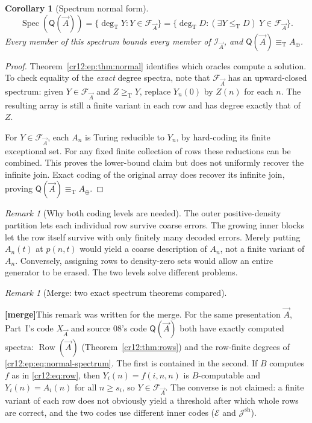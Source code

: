 \documentclass[11pt,letterpaper]{article}
\theoremstyle{plain}
\newtheorem{corollary}[theorem]{Corollary}
\theoremstyle{definition}
\theoremstyle{remark}
\newtheorem{remark}[theorem]{Remark}
\numberwithin{equation}{section}
\newcommand{\leT}{\leq_{\mathrm T}}
\newcommand{\geT}{\geq_{\mathrm T}}
\newcommand{\eqT}{\equiv_{\mathrm T}}
\newcommand{\Spec}{\operatorname{Spec}}
\newcommand{\Row}{\operatorname{Row}}
\newcommand{\degT}{\deg_{\mathrm T}}
\newcommand{\Ecode}{\mathcal E}
\newcommand{\I}{\mathcal I}
\newcommand{\mergenote}[1]{\par\smallskip\noindent
 {\small\textsf{\textbf{[merge]}}\enspace #1}\par\smallskip}
\newcommand{\Aplus}{A_{\oplus}}          %
\newcommand{\Jsh}{\mathcal J^{\mathrm{sh}}} %
\newcommand{\QQ}{\mathsf Q}              %
\newcommand{\FF}{\mathcal F}             %
\begin{document}
\begin{corollary}[Spectrum normal form]\label{cr12:ep:cor:normal-spectrum}
\begin{equation}\label{cr12:ep:eq:normal-spectrum}
 \Spec(\QQ(\vec A))
 =\{\degT Y:Y\in\FF_{\vec A}\}
 =\{\degT D:(\exists Y\leT D)\ Y\in\FF_{\vec A}\}.
\end{equation}
Every member of this spectrum bounds every member of $\I_{\vec A}$, and
$\QQ(\vec A)\eqT \Aplus$.
\end{corollary}
\begin{proof}
Theorem~\ref{cr12:ep:thm:normal} identifies which oracles compute a solution. To
check equality of the \emph{exact} degree spectra, note that $\FF_{\vec A}$ has an
upward-closed spectrum: given $Y\in\FF_{\vec A}$ and $Z\geT Y$, replace $Y_n(0)$ by
$Z(n)$ for each $n$. The resulting array is still a finite variant in each row and
has degree exactly that of $Z$.

For $Y\in\FF_{\vec A}$, each $A_n$ is Turing reducible to $Y_n$, by hard-coding its
finite exceptional set. For any fixed finite collection of rows these reductions can
be combined. This proves the lower-bound claim but does not uniformly recover the
infinite join. Exact coding of the original array does recover its infinite join,
proving $\QQ(\vec A)\eqT \Aplus$.
\end{proof}

\begin{remark}[Why both coding levels are needed]
The outer positive-density partition lets each individual row survive coarse
errors. The growing inner blocks let the row itself survive with only finitely many
decoded errors. Merely putting $A_n(t)$ at $p(n,t)$ would yield a coarse description
of $A_n$, not a finite variant of $A_n$. Conversely, assigning rows to density-zero
sets would allow an entire generator to be erased. The two levels solve different
problems.
\end{remark}

\begin{remark}[Merge: two exact spectrum theorems compared]\label{cr12:ep:rem:rowcompare}
\mergenote{This remark was written for the merge. For the same presentation $\vec A$,
Part~I's code $X_{\vec A}$ and source 08's code $\QQ(\vec A)$ both have exactly
computed spectra: $\Row(\vec A)$ (Theorem~\ref{cr12:thm:rows}) and the row-finite
degrees of \eqref{cr12:ep:eq:normal-spectrum}. The first is contained in the second.
If $B$ computes $f$ as in \eqref{cr12:eq:row}, then $Y_i(n)=f(i,n,n)$ is
$B$-computable and $Y_i(n)=A_i(n)$ for all $n\ge s_i$, so $Y\in\FF_{\vec A}$. The
converse is not claimed: a finite variant of each row does not obviously yield a
threshold after which whole rows are correct, and the two codes use different inner
codes ($\Ecode$ and $\Jsh$).}
\end{remark}
\end{document}
